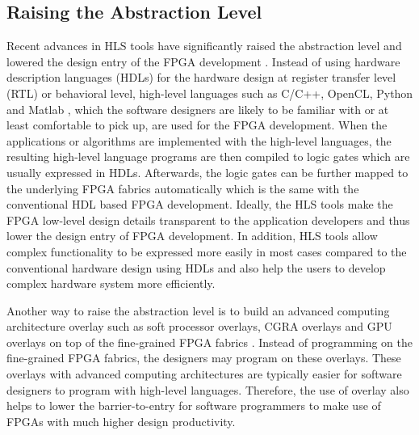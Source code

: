 \subsection{Raising the Abstraction Level}
Recent advances in HLS tools have significantly raised the abstraction level and lowered the design entry of the FPGA development \cite{cong2011high}. Instead of using hardware description languages (HDLs) for the hardware design at register transfer level (RTL) or behavioral level, high-level languages such as C/C++, OpenCL, Python and Matlab \cite{canis2011legup, cardoso2011compilation, handel-c, ROCCC, matlab, myhdl, OpenCL, VivadoHLS}, which the software designers are likely to be familiar with or at least comfortable to pick up, are used for the FPGA development. When the applications or algorithms are implemented with the high-level languages, the resulting high-level language programs are then compiled to logic gates which are usually expressed in HDLs. Afterwards, the logic gates can be further mapped to the underlying FPGA fabrics automatically which is the same with the conventional HDL based FPGA development. Ideally, the HLS tools make the FPGA low-level design details transparent to the application developers and thus lower the design entry of FPGA development. In addition, HLS tools allow complex functionality to be expressed more easily in most cases compared to the conventional hardware design using HDLs and also help the users to develop complex hardware system more efficiently. 

Another way to raise the abstraction level is to build an advanced computing architecture overlay such as soft processor overlays, CGRA overlays and GPU overlays on top of the fine-grained FPGA fabrics \cite{cheah2012iDEA, laforest2012OCTAVO, yiannacouras2007exploration, ferreira2011fpga, kissler2006dynamically, shukla2006quku, lin2012energy, capalijia2013pipelined, jeffrey2011potential}. Instead of programming on the fine-grained FPGA fabrics, the designers may program on these overlays. These overlays with advanced computing architectures are typically easier for software designers to program with high-level languages. Therefore, the use of overlay also helps to lower the barrier-to-entry for software programmers to make use of FPGAs with much higher design productivity. 

